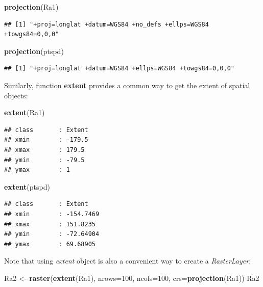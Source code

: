 \documentclass[]{report}
\newenvironment{Shaded}{\begin{snugshade}}{\end{snugshade}}
\newcommand{\DataTypeTok}[1]{\textcolor[rgb]{0.13,0.29,0.53}{#1}}
\newcommand{\DecValTok}[1]{\textcolor[rgb]{0.00,0.00,0.81}{#1}}
\newcommand{\KeywordTok}[1]{\textcolor[rgb]{0.13,0.29,0.53}{\textbf{#1}}}
\newcommand{\NormalTok}[1]{#1}
\newcommand{\StringTok}[1]{\textcolor[rgb]{0.31,0.60,0.02}{#1}}
\begin{document}
\begin{Shaded}
\begin{Highlighting}[]
\KeywordTok{projection}\NormalTok{(Ra1)}
\end{Highlighting}
\end{Shaded}

\begin{verbatim}
## [1] "+proj=longlat +datum=WGS84 +no_defs +ellps=WGS84 +towgs84=0,0,0"
\end{verbatim}

\begin{Shaded}
\begin{Highlighting}[]
\KeywordTok{projection}\NormalTok{(ptspd)}
\end{Highlighting}
\end{Shaded}

\begin{verbatim}
## [1] "+proj=longlat +datum=WGS84 +ellps=WGS84 +towgs84=0,0,0"
\end{verbatim}

Similarly, function \textbf{extent} provides a common way to get the
extent of spatial objects:

\begin{Shaded}
\begin{Highlighting}[]
\KeywordTok{extent}\NormalTok{(Ra1)}
\end{Highlighting}
\end{Shaded}

\begin{verbatim}
## class       : Extent 
## xmin        : -179.5 
## xmax        : 179.5 
## ymin        : -79.5 
## ymax        : 1
\end{verbatim}

\begin{Shaded}
\begin{Highlighting}[]
\KeywordTok{extent}\NormalTok{(ptspd)}
\end{Highlighting}
\end{Shaded}

\begin{verbatim}
## class       : Extent 
## xmin        : -154.7469 
## xmax        : 151.8235 
## ymin        : -72.64904 
## ymax        : 69.68905
\end{verbatim}

Note that using \emph{extent} object is also a convenient way to create
a \emph{RasterLayer}:

\begin{Shaded}
\begin{Highlighting}[]
\NormalTok{Ra2 <-}\StringTok{ }\KeywordTok{raster}\NormalTok{(}\KeywordTok{extent}\NormalTok{(Ra1), }\DataTypeTok{nrows=}\DecValTok{100}\NormalTok{, }\DataTypeTok{ncols=}\DecValTok{100}\NormalTok{, }\DataTypeTok{crs=}\KeywordTok{projection}\NormalTok{(Ra1))}
\NormalTok{Ra2}
\end{Highlighting}
\end{Shaded}
\end{document}
